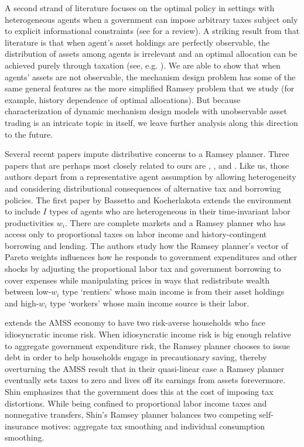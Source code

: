 \documentclass[thmsb,11pt]{article}
\begin{document}
A second strand of literature focuses on the optimal policy in settings with
heterogeneous agents when a government can impose arbitrary taxes subject only
to explicit informational constraints (see \citet{golosov2007new} for a review). A striking result from that literature
is that when  agent's asset holdings are perfectly observable, the distribution of assets among
agents is irrelevant and an optimal allocation can be achieved purely through
taxation (see, e.g. \citet{Bassetto2004}).   We are able to show that when
agents' assets are not observable, the mechanism design problem has some of
the same general features as the more simplified Ramsey problem that we
study (for example, history dependence of optimal allocations).  But because  characterization of dynamic mechanism design models with
unobservable asset trading is an intricate topic in itself, we leave further analysis along this
direction to the  future.

Several recent papers impute distributive concerns to a Ramsey planner.
Three papers that are perhaps most closely related to ours are \citet{Bassetto2004}, \citet{shin2006ramsey}, and \citet{Wer07a}. Like us, those authors depart from
a representative agent assumption by allowing heterogeneity and considering
distributional consequences of alternative tax and borrowing policies.
The first paper by Bassetto and Kocherlakota  extends the \citet{LucasJr.1983} environment to include $I$ types of
agents who are heterogeneous in their time-invariant labor productivities $%
w_{i}$. There are complete markets and a Ramsey planner who has access only
to proportional taxes on labor income and history-contingent borrowing and
lending. The authors study how the Ramsey planner's vector of Pareto weights
influences how he responds to government expenditures and other shocks by
adjusting the proportional labor tax and government borrowing to cover
expenses while manipulating prices in ways that redistribute wealth between
low-$w_{i}$ type `rentiers' whose main income is from their asset holdings
and high-$w_{i}$ type `workers' whose main income source is their labor.

\citet{shin2006ramsey} extends the AMSS economy to have two risk-averse households who
face idiosyncratic income risk. When idiosyncratic income risk is big enough
relative to aggregate government expenditure risk, the Ramsey planner
chooses to issue debt in order to help households engage in precautionary
saving, thereby overturning the AMSS result that  in their quasi-linear case a
 Ramsey planner  eventually sets taxes to zero and lives off its earnings from assets forevermore.
  Shin emphasizes that the
government does this at the cost of imposing tax distortions. While being
confined to proportional labor income taxes and nonnegative
transfers, Shin's Ramsey planner balances two competing self-insurance
motives: aggregate tax smoothing and individual consumption smoothing.
\end{document}
